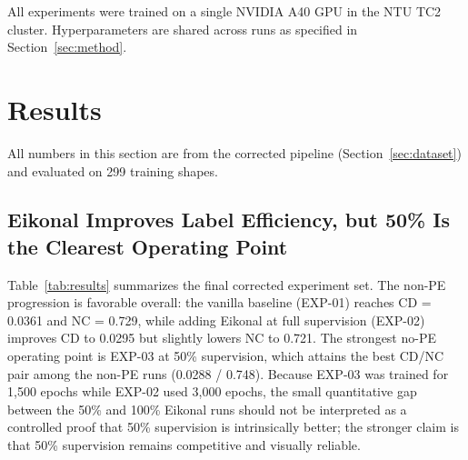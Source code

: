 \documentclass[conference]{IEEEtran}
\begin{document}
All experiments were trained on a single NVIDIA A40 GPU in the NTU TC2 cluster. Hyperparameters are shared across runs as specified in Section~\ref{sec:method}.

\section{Results}

All numbers in this section are from the corrected pipeline (Section~\ref{sec:dataset}) and evaluated on 299 training shapes.

\subsection{Eikonal Improves Label Efficiency, but 50\% Is the Clearest Operating Point}
\label{sec:eikonal_results}

Table~\ref{tab:results} summarizes the final corrected experiment set. The
non-PE progression is favorable overall: the vanilla baseline (EXP-01) reaches
CD = 0.0361 and NC = 0.729, while adding Eikonal at full supervision (EXP-02)
improves CD to 0.0295 but slightly lowers NC to 0.721. The strongest no-PE operating point is EXP-03 at 50\%
supervision, which attains the best CD/NC pair among the non-PE runs
(0.0288 / 0.748). Because EXP-03 was trained for 1{,}500 epochs while EXP-02 used 3{,}000 epochs,
the small quantitative gap between the 50\% and 100\% Eikonal runs should not
be interpreted as a controlled proof that 50\% supervision is intrinsically
better; the stronger claim is that 50\% supervision remains competitive and
visually reliable.
\end{document}
